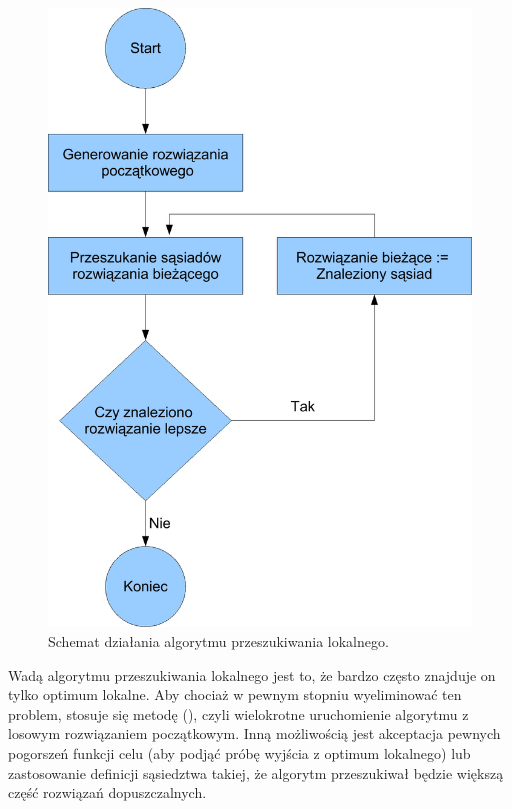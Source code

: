 \begin{figure}[t]
\begin{center}
\includegraphics[scale=0.5]{figures/ls_schemat.pdf}
\end{center}
\caption{Schemat działania algorytmu przeszukiwania lokalnego.}\label{rys:ls}
\end{figure}

Wadą algorytmu przeszukiwania lokalnego jest to, że bardzo często znajduje on tylko optimum lokalne. Aby chociaż w pewnym stopniu wyeliminować 
ten problem, stosuje się metodę  (), czyli  wielokrotne uruchomienie algorytmu 
z losowym rozwiązaniem początkowym. Inną możliwością jest akceptacja pewnych pogorszeń funkcji celu (aby podjąć próbę wyjścia z optimum 
lokalnego) lub zastosowanie definicji sąsiedztwa takiej, że algorytm przeszukiwał będzie większą część rozwiązań dopuszczalnych.

